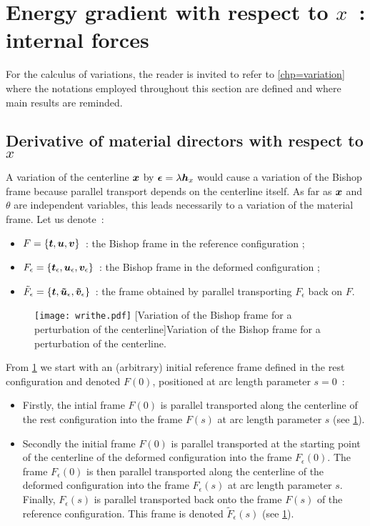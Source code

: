 \section{Energy gradient with respect to $x$~: internal forces}\label{sec=dE_dx}

For the calculus of variations, the reader is invited to refer to \cref{chp=variation} where the notations employed throughout this section are defined and where main results are reminded.

\subsection{Derivative of material directors with respect to $x$}
A variation of the centerline $\boldsymbol{x}$ by $\boldsymbol{\epsilon} = \lambda \boldsymbol{h}_x$ would cause a variation of the Bishop frame because parallel transport depends on the centerline itself. As far as $\boldsymbol{x}$ and $\theta$ are independent variables, this leads necessarily to a variation of the material frame. Let us denote~:
\begin{itemize}
\item
$F = \{\boldsymbol{t}, \boldsymbol{u},\boldsymbol{v}\}$~: the Bishop frame in the reference configuration ;
\item
 $F_\epsilon = \{\boldsymbol{t}_\epsilon, \boldsymbol{u}_\epsilon,\boldsymbol{v}_\epsilon\}$~: the Bishop frame in the deformed configuration ;
 \item
$\tilde{F}_\epsilon = \{\boldsymbol{t}, \boldsymbol{\tilde{u}}_\epsilon,\boldsymbol{\tilde{v}}_\epsilon\}$~: the frame obtained by parallel transporting $F_\epsilon$ back on $F$.
\end{itemize}
\begin{figure}[p]
\begin{fullpage}
\centering
\texttt{[image: writhe.pdf]}
[Variation of the Bishop frame for a perturbation of the centerline]{Variation of the Bishop frame for a perturbation of the centerline.}
\label{fig:varbishop}
\end{fullpage}
\end{figure}
From \cref{fig:varbishop} we start with an (arbitrary) initial reference frame defined in the rest configuration and denoted $F(0)$, positioned at arc length parameter $s=0$~:
\begin{itemize}
\item
Firstly, the intial frame $F(0)$ is parallel transported along the centerline of the rest configuration into the frame $F(s)$ at arc length parameter $s$ (see \cref{fig:varbishop}).
\item
Secondly the initial frame $F(0)$ is parallel transported at the starting point of the centerline of the deformed configuration into the frame $F_{\epsilon}(0)$. The frame $F_{\epsilon}(0)$ is then parallel transported along the centerline of the deformed configuration into the frame $F_{\epsilon}(s)$ at arc length parameter $s$. Finally, $F_{\epsilon}(s)$ is parallel transported back onto the frame $F(s)$ of the reference configuration. This frame is denoted $\tilde{F}_\epsilon(s)$ (see \cref{fig:varbishop}).
\end{itemize}
